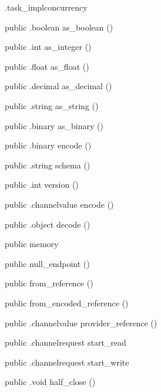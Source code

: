 \begin{CrexxClass}{.task\_impl}{concurrency}
\begin{Members}
    \Method
      {public}
      {.boolean}
      {as\_boolean}
      {()}

    \Method
      {public}
      {.int}
      {as\_integer}
      {()}

    \Method
      {public}
      {.float}
      {as\_float}
      {()}

    \Method
      {public}
      {.decimal}
      {as\_decimal}
      {()}

    \Method
      {public}
      {.string}
      {as\_string}
      {()}

    \Method
      {public}
      {.binary}
      {as\_binary}
      {()}

    \Method
      {public}
      {.binary}
      {encode}
      {()}

    \Method
      {public}
      {.string}
      {schema}
      {()}

    \Method
      {public}
      {.int}
      {version}
      {()}

    \Method
      {public}
      {.channelvalue}
      {encode}
      {()}

    \Method
      {public}
      {.object}
      {decode}
      {()}

    \Factory
      {public}
      {memory}
      {}

    \Factory
      {public}
      {null\_endpoint}
      {()}

    \Factory
      {public}
      {from\_reference}
      {()}

    \Factory
      {public}
      {from\_encoded\_reference}
      {()}

    \Method
      {public}
      {.channelvalue}
      {provider\_reference}
      {()}

    \Method
      {public}
      {.channelrequest}
      {start\_read}
      {}

    \Method
      {public}
      {.channelrequest}
      {start\_write}
      {}

    \Method
      {public}
      {.void}
      {half\_close}
      {()}


\end{Members}
\end{CrexxClass}
